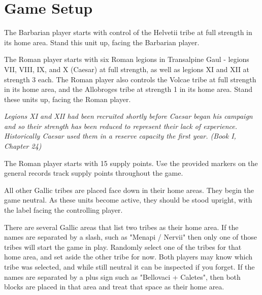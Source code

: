 \section{Game Setup}

The Barbarian player starts with control of the Helvetii tribe at full strength in its home area. Stand this unit up, facing the Barbarian player.

The Roman player starts with six Roman legions in Transalpine Gaul - legions VII, VIII, IX, and X (Caesar) at full strength, as well as legions XI and XII at strength 3 each. The Roman player also controls the Volcae tribe at full strength in its home area, and the Allobroges tribe at strength 1 in its home area. Stand these units up, facing the Roman player.

\textit{Legions XI and XII had been recruited shortly before Caesar began his campaign and so their strength has been reduced to represent their lack of experience. Historically Caesar used them in a reserve capacity the first year. (Book I, Chapter 24)}

The Roman player starts with 15 supply points. Use the provided markers on the general records track supply points throughout the game.

All other Gallic tribes are placed face down in their home areas. They begin the game neutral. As these units become active, they should be stood upright, with the label facing the controlling player.

There are several Gallic areas that list two tribes as their home area. If the names are separated by a slash, such as "Menapi / Nervii" then only one of those tribes will start the game in play. Randomly select one of the tribes for that home area, and set aside the other tribe for now. Both players may know which tribe was selected, and while still neutral it can be inspected if you forget. If the names are separated by a plus sign such as "Bellovaci + Caletes", then both blocks are placed in that area and treat that space as their home area.